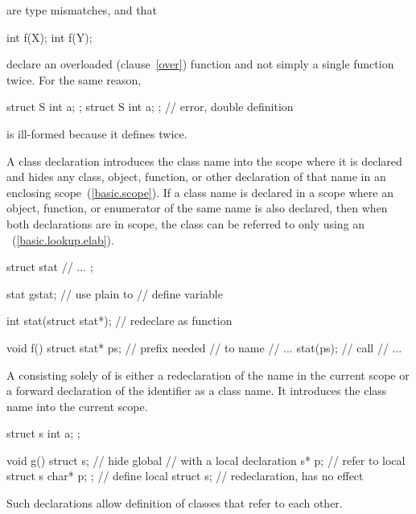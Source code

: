 are type mismatches, and that

\begin{codeblock}
int f(X);
int f(Y);
\end{codeblock}

%
declare an overloaded (clause~\ref{over}) function  and not
simply a single function  twice. For the same reason,

\begin{codeblock}
struct S { int a; };
struct S { int a; };            // error, double definition
\end{codeblock}

is ill-formed because it defines  twice.
\exitexample

\pnum
{}%
%
A class declaration introduces the class name into the scope where
%
it is declared and hides any
class, object, function, or other declaration of that name in an
enclosing scope~(\ref{basic.scope}). If a class name is declared in a
scope where an object, function, or enumerator of the same name is also
declared, then when both declarations are in scope, the class can be
referred to only using an
~(\ref{basic.lookup.elab}).
\enterexample

\begin{codeblock}
struct stat {
	// ...
};

stat gstat;                     // use plain  to
                                // define variable

int stat(struct stat*);         // redeclare  as function

void f()
{
    struct stat* ps;            //  prefix needed
                                // to name 
				// ...
    stat(ps);                   // call 
				// ...
}
\end{codeblock}
\exitexampleb
{}%
%
A  consisting solely of  is either a redeclaration of the name in the current scope
or a forward declaration of the identifier as a class name. It
introduces the class name into the current scope.
\enterexample

\begin{codeblock}
struct s { int a; };

void g()
{
    struct s;                   // hide global 
                                // with a local declaration
    s* p;                       // refer to local 
    struct s { char* p; };      // define local 
    struct s;                   // redeclaration, has no effect
}
\end{codeblock}
\exitexampleb
\enternote
Such declarations allow definition of classes that refer to each other.
%
\enterexample

